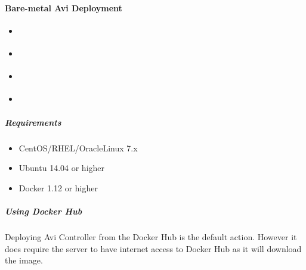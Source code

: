 \documentclass[letterpaper,10pt,english]{sphinxmanual}
\begin{document}
\paragraph{Bare-metal Avi Deployment}
\label{\detokenize{integrations/ansible/controller:bare-metal-avi-deployment}}
\begin{sphinxShadowBox}
\begin{itemize}
\item {} 
\label{\detokenize{integrations/ansible/controller:id14}}{\hyperref[\detokenize{integrations/ansible/controller:requirements}]{}}

\item {} 
\label{\detokenize{integrations/ansible/controller:id15}}{\hyperref[\detokenize{integrations/ansible/controller:using-docker-hub}]{}}

\item {} 
\label{\detokenize{integrations/ansible/controller:id16}}{\hyperref[\detokenize{integrations/ansible/controller:using-a-private-docker-repository}]{}}

\item {} 
\label{\detokenize{integrations/ansible/controller:id17}}{\hyperref[\detokenize{integrations/ansible/controller:using-a-compressed-docker-image}]{}}

\end{itemize}
\end{sphinxShadowBox}


\subparagraph{Requirements}
\label{\detokenize{integrations/ansible/controller:requirements}}\begin{itemize}
\item {} 
CentOS/RHEL/OracleLinux 7.x

\item {} 
Ubuntu 14.04 or higher

\item {} 
Docker 1.12 or higher

\end{itemize}


\subparagraph{Using Docker Hub}
\label{\detokenize{integrations/ansible/controller:using-docker-hub}}
Deploying Avi Controller from the Docker Hub is the default action. However it does require the server to have internet access to Docker Hub as it will download the image.
\end{document}
